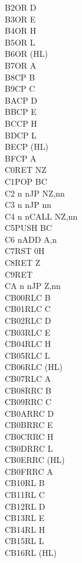 \documentclass[twoside,openright,a4paper]{book}
\begin{document}
\begin{multicols}{3}
{\begin{tabbing}
	B2\>OR D\\
	B3\>OR E\\
	B4\>OR H\\
	B5\>OR L\\
	B6\>OR (HL)\\
	B7\>OR A\\
	B8\>CP B\\
	B9\>CP C\\
	BA\>CP D\\
	BB\>CP E\\
	BC\>CP H\\
	BD\>CP L\\
	BE\>CP (HL)\\
	BF\>CP A\\
	C0\>RET NZ\\
	C1\>POP BC\\
	C2 n n\>JP NZ,nn\\
	C3 n n\>JP nn\\
	C4 n n\>CALL NZ,nn\\
	C5\>PUSH BC\\
	C6 n\>ADD A,n\\
	C7\>RST 0H\\
	C8\>RET Z\\
	C9\>RET\\
	CA n n\>JP Z,nn\\
	CB00\>RLC B\\
	CB01\>RLC C\\
	CB02\>RLC D\\
	CB03\>RLC E\\
	CB04\>RLC H\\
	CB05\>RLC L\\
	CB06\>RLC (HL)\\
	CB07\>RLC A\\
	CB08\>RRC B\\
	CB09\>RRC C\\
	CB0A\>RRC D\\
	CB0B\>RRC E\\
	CB0C\>RRC H\\
	CB0D\>RRC L\\
	CB0E\>RRC (HL)\\
	CB0F\>RRC A\\
	CB10\>RL B\\
	CB11\>RL C\\
	CB12\>RL D\\
	CB13\>RL E\\
	CB14\>RL H\\
	CB15\>RL L\\
	CB16\>RL (HL)\\

\end{tabbing}}
\end{multicols}
\end{document}
